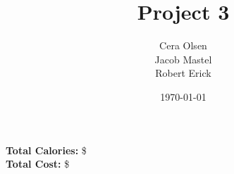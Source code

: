 \documentclass[11pt]{article}
\title{Project 3}
\author{Cera Olsen\\Jacob Mastel\\Robert Erick}
\date{\today}
\begin{document}
	\maketitle\textbf{Total Calories:} \$ \\
\textbf{Total Cost:} \$
	
	
	
\end{document}
